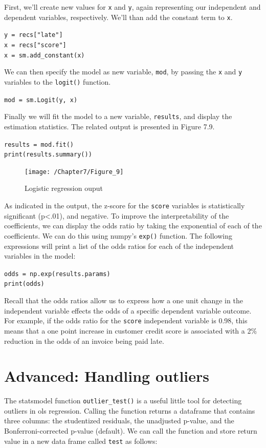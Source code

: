 \documentclass{book}
\begin{document}
First, we'll create new values for \texttt{x} and \texttt{y}, again representing our independent and dependent variables, respectively. We'll than add the constant term to \texttt{x}.

\texttt{y = recs["late"]\\x = recs["score"]\\x = sm.add\_constant(x)}

We can then specify the model as new variable, \texttt{mod}, by passing the \texttt{x} and \texttt{y} variables to the \texttt{logit()} function.

\texttt{mod = sm.Logit(y, x)}

Finally we will fit the model to a new variable, \texttt{results}, and display the estimation statistics. The related output is presented in Figure 7.9.

\texttt{results = mod.fit()\\print(results.summary())}

\begin{figure}[h]
	\caption{Logistic regression ouput}
	\centering\texttt{[image: /Chapter7/Figure\_9]}
\end{figure}

As indicated in the output, the z-score for the \texttt{score} variables is statistically significant (p\textless .01), and negative. To improve the interpretability of the coefficients, we can display the odds ratio by taking the exponential of each of the coefficients. We can do this using numpy's \texttt{exp()} function. The following expressions will print a list of the odds ratios for each of the independent variables in the model:

\texttt{odds = np.exp(results.params)\\
	print(odds)}

Recall that the odds ratios allow us to express how a one unit change in the independent variable effects the odds of a specific dependent variable outcome. For example, if the odds ratio for the \texttt{score} independent variable is 0.98, this means that a one point increase in customer credit score is associated with a 2\% reduction in the odds of an invoice being paid late.

\section{Advanced: Handling outliers}

The statsmodel function \texttt{outlier\_test()} is a useful little tool for detecting outliers in ols regression. Calling the function returns a dataframe that contains three columns: the studentized residuals, the unadjusted p-value, and the Bonferroni-corrected p-value (default). We can call the function and store return value in a new data frame called \texttt{test} as follows:
\end{document}
